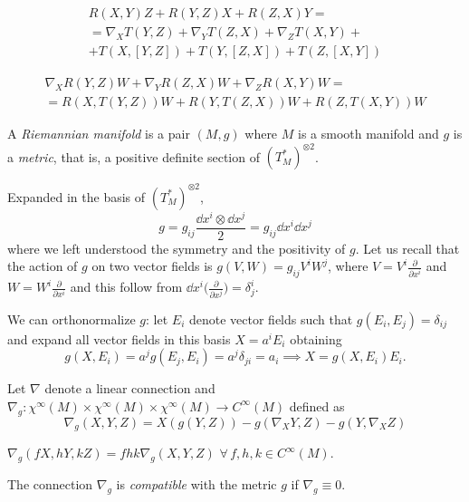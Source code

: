 \documentclass[a4paper,12pt]{book}
\begin{document}
\begin{exercise}
\label{bianchitorsion}
\begin{multline*}
R(X,Y)Z+R(Y,Z)X+R(Z,X)Y=\\
=\nabla_XT(Y,Z)+\nabla_YT(Z,X)+\nabla_ZT(X,Y)+\\
+T(X,[Y,Z])+T(Y,[Z,X])+T(Z,[X,Y])
\end{multline*}
\end{exercise}

\begin{exercise}
\begin{multline*}\nabla_XR(Y,Z)W+\nabla_YR(Z,X)W+\nabla_ZR(X,Y)W=\\
=R(X,T(Y,Z))W+R(Y,T(Z,X))W+R(Z,T(X,Y))W\end{multline*}
\end{exercise}

\begin{definition}
A \emph{Riemannian manifold} is a pair $(M,g)$ where $M$ is a smooth manifold and $g$ is a \emph{metric}, that is, a positive definite section of $(T_M^*)^{\otimes2}$.
\end{definition}

Expanded in the basis of $(T_M^*)^{\otimes2}$,
\[g=g_{ij}\frac{\dd x^i\otimes\dd x^j}{2}=g_{ij}\dd x^i\dd x^j\]
where we left understood the symmetry and the positivity of $g$. Let us recall that the action of $g$ on two vector fields is $g(V,W)=g_{ij}V^iW^j$, where $V=V^i\frac{\partial}{\partial x^i}$ and $W=W^i\frac{\partial}{\partial x^i}$ and this follow from $\dd x^i\bigl(\frac{\partial}{\partial x^j}\bigr)=\delta^i_j$.

We can orthonormalize $g$: let $E_i$ denote vector fields such that $g(E_i,E_j)=\delta_{ij}$ and expand all vector fields in this basis $X=a^iE_i$ obtaining
\[g(X,E_i)=a^jg(E_j,E_i)=a^j\delta_{ji}=a_i\implies X=g(X,E_i)E_i.\]

Let $\nabla$ denote a linear connection and $\nabla_g\colon\chi^\infty(M)\times\chi^\infty(M)\times\chi^\infty(M)\to C^\infty(M)$ defined as
\[\nabla_g(X,Y,Z)=X(g(Y,Z))-g(\nabla_XY,Z)-g(Y,\nabla_XZ)\]

\begin{exercise}
$\nabla_g(fX,hY,kZ)=fhk\nabla_g(X,Y,Z)$ $\forall\,f,h,k\in C^\infty(M)$.
\end{exercise}

\begin{definition}
The connection $\nabla_g$ is \emph{compatible} with the metric $g$ if $\nabla_g\equiv0$.
\end{definition}
\end{document}
